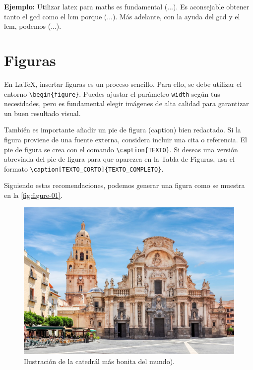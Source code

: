 \vspace{.875em}
\textbf{Ejemplo:} Utilizar \Gls{latex} para \Gls{maths} es fundamental (...). Es aconsejable obtener tanto el \acrfull{gcd} como el \acrfull{lcm} porque (...). Más adelante, con la ayuda del \acrshort{gcd} y el \acrshort{lcm}, podemos (...).

\section{Figuras}

En \LaTeX, insertar figuras es un proceso sencillo. Para ello, se debe utilizar el entorno \verb|\begin{figure}|. Puedes ajustar el parámetro \verb|width| según tus necesidades, pero es fundamental elegir imágenes de alta calidad para garantizar un buen resultado visual.

También es importante añadir un pie de figura (caption) bien redactado. Si la figura proviene de una fuente externa, considera incluir una cita o referencia. El pie de figura se crea con el comando \verb|\caption{TEXTO}|. Si deseas una versión abreviada del pie de figura para que aparezca en la Tabla de Figuras, usa el formato \verb|\caption[TEXTO_CORTO]{TEXTO_COMPLETO}|.

Siguiendo estas recomendaciones, podemos generar una figura como se muestra en la \autoref{fig:figure-01}.

\begin{figure}[!htpb]
    \centering
    \includegraphics[width=\linewidth]{Figures/catedral.jpg}
    \caption[La catedral más bonita del mundo]{Ilustración de la catedrál más bonita del mundo).}
    \label{fig:figure-01}
\end{figure}

